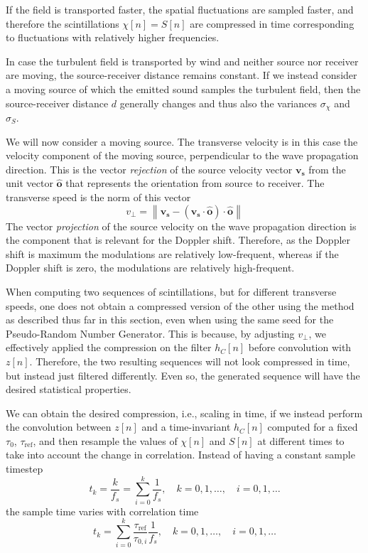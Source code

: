 If the field is transported faster, the spatial fluctuations are sampled faster,
and therefore the scintillations $\chi[n]=S[n]$ are compressed in time
corresponding to fluctuations with relatively higher frequencies.

In case the turbulent field is transported by wind and neither source nor
receiver are moving, the source-receiver distance remains constant. If we
instead consider a moving source of which the emitted sound samples the turbulent field, then the
source-receiver distance $d$ generally changes and thus also the variances $\sigma_{\chi}$ and $\sigma_{S}$.

We will now consider a moving source. The transverse velocity is in this case
the velocity component of the moving source, perpendicular to the wave
propagation direction. This is the vector \emph{rejection} of the source
velocity vector $\mathbf{v_s}$ from the unit vector $\mathbf{\hat{o}}$ that
represents the orientation from source to receiver. The transverse speed is the
norm of this vector
\begin{equation}
 v_{\bot} = \left\| \mathbf{v_s} - (\mathbf{v_s} \cdot  \mathbf{\hat{o}} ) \cdot \mathbf{\hat{o}}  \right\|
\end{equation}
The vector \emph{projection} of the source velocity on the wave propagation
direction is the component that is relevant for the Doppler shift. Therefore, as
the Doppler shift is maximum the modulations are relatively low-frequent,
whereas if the Doppler shift is zero, the modulations are relatively
high-frequent.

When computing two sequences of scintillations, but for different
transverse speeds, one does not obtain a compressed version of the other using
the method as described thus far in this section, even when using the same seed
for the Pseudo-Random Number Generator. This is because, by adjusting $v_{\bot}$,
we effectively applied the compression on the filter $h_C[n]$ before convolution
with $z[n]$. Therefore, the two resulting sequences will not look compressed in
time, but instead just filtered differently. Even so, the generated sequence will
have the desired statistical properties.

We can obtain the desired compression, i.e., scaling in time, if we instead
perform the convolution between $z[n]$ and a time-invariant $h_C[n]$ computed for a fixed $\tau_0$, $\tau_{\mathrm{ref}}$, and then
resample the values of $\chi[n]$ and $S[n]$ at different times to take into
account the change in correlation. Instead of having a constant sample timestep
\begin{equation}
 t_k = \frac{k}{f_s} = \sum_{i=0}^k \frac{1}{f_s}, \quad k=0, 1, \dots, \quad i=0, 1, \dots
\end{equation}
the sample time varies with correlation time
\begin{equation}
  t_k = \sum_{i=0}^k \frac{\tau_{\mathrm{ref}}}{\tau_{0,i}} \frac{1}{f_s} , \quad k=0, 1, \dots, \quad i=0, 1, \dots
\end{equation}

